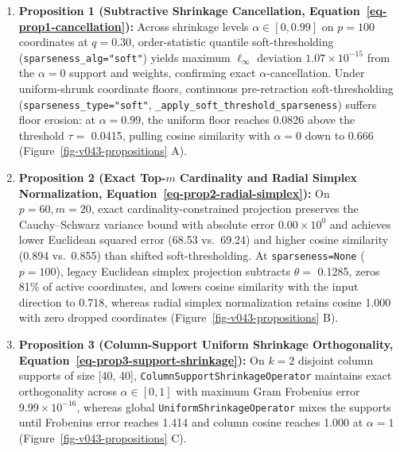 \documentclass[
  10pt,
  letterpaper,
]{report}
\providecommand{\tightlist}{%
  \setlength{\itemsep}{0pt}\setlength{\parskip}{0pt}}
\begin{document}
\begin{enumerate}
\def\labelenumi{\arabic{enumi}.}
\tightlist
\item
  \textbf{Proposition 1 (Subtractive Shrinkage Cancellation,
  Equation~\ref{eq-prop1-cancellation}):} Across shrinkage levels
  \(\alpha \in [0, 0.99]\) on \(p = 100\) coordinates at \(q = 0.30\),
  order-statistic quantile soft-thresholding
  (\texttt{sparseness\_alg="soft"}) yields maximum \(\ell_\infty\)
  deviation \(1.07 \times 10^{-15}\) from the \(\alpha = 0\) support and
  weights, confirming exact \(\alpha\)-cancellation. Under
  uniform-shrunk coordinate floors, continuous pre-retraction
  soft-thresholding (\texttt{sparseness\_type="soft"},
  \texttt{\_apply\_soft\_threshold\_sparseness}) suffers floor erosion:
  at \(\alpha = 0.99\), the uniform floor reaches 0.0826 above the
  threshold \(\tau =\) 0.0415, pulling cosine similarity with
  \(\alpha = 0\) down to 0.666 (Figure~\ref{fig-v043-propositions} A).
\item
  \textbf{Proposition 2 (Exact Top-\(m\) Cardinality and Radial Simplex
  Normalization, Equation~\ref{eq-prop2-radial-simplex}):} On
  \(p = 60, m = 20\), exact cardinality-constrained projection preserves
  the Cauchy--Schwarz variance bound with absolute error
  \(0.00 \times 10^{0}\) and achieves lower Euclidean squared error
  (68.53 vs.~69.24) and higher cosine similarity (0.894 vs.~0.855) than
  shifted soft-thresholding. At \texttt{sparseness=None} (\(p = 100\)),
  legacy Euclidean simplex projection subtracts \(\theta =\) 0.1285,
  zeros 81\% of active coordinates, and lowers cosine similarity with
  the input direction to 0.718, whereas radial simplex normalization
  retains cosine 1.000 with zero dropped coordinates
  (Figure~\ref{fig-v043-propositions} B).
\item
  \textbf{Proposition 3 (Column-Support Uniform Shrinkage Orthogonality,
  Equation~\ref{eq-prop3-support-shrinkage}):} On \(k = 2\) disjoint
  column supports of size {[}40, 40{]},
  \texttt{ColumnSupportShrinkageOperator} maintains exact orthogonality
  across \(\alpha \in [0, 1]\) with maximum Gram Frobenius error
  \(9.99 \times 10^{-16}\), whereas global
  \texttt{UniformShrinkageOperator} mixes the supports until Frobenius
  error reaches 1.414 and column cosine reaches 1.000 at \(\alpha = 1\)
  (Figure~\ref{fig-v043-propositions} C).
\end{enumerate}
\end{document}
